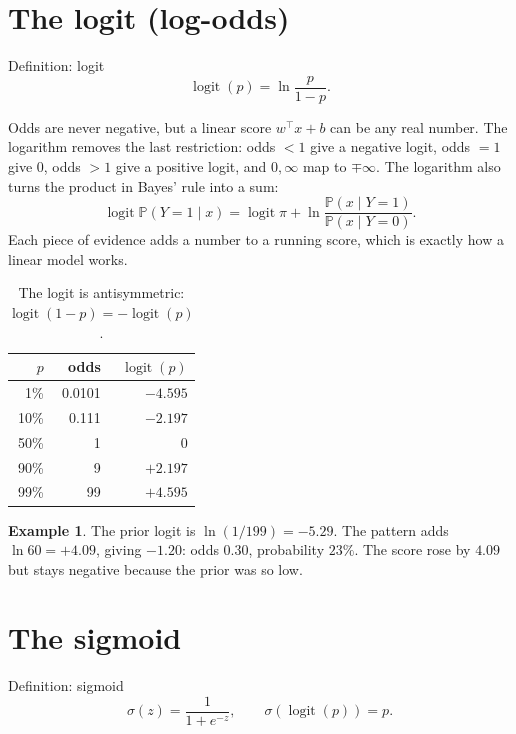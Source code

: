 \documentclass[11pt,a4paper]{article}
\newcommand{\Prob}{\mathbb{P}}
\DeclareMathOperator{\logit}{logit}
\theoremstyle{definition}
\newtheorem{example}{Example}
\begin{document}
\section{The logit (log-odds)}

\begin{metric}{Definition: logit}
\[
\logit(p)=\ln\frac{p}{1-p}.
\]
\end{metric}

Odds are never negative, but a linear score $w^\top x+b$ can be any real number. The logarithm removes the last restriction: odds $<1$ give a negative logit, odds $=1$ give $0$, odds $>1$ give a positive logit, and $0,\infty$ map to $\mp\infty$. The logarithm also turns the product in Bayes' rule into a sum:
\[
\logit\Prob(Y=1\mid x)=\logit\pi+\ln\frac{\Prob(x\mid Y=1)}{\Prob(x\mid Y=0)}.
\]
Each piece of evidence adds a number to a running score, which is exactly how a linear model works.

\begin{table}[h]
\centering
\begin{tabular}{rrr}
\toprule
$p$ & odds & $\logit(p)$\\
\midrule
1\% & 0.0101 & $-4.595$\\
10\% & 0.111 & $-2.197$\\
50\% & 1 & $0$\\
90\% & 9 & $+2.197$\\
99\% & 99 & $+4.595$\\
\bottomrule
\end{tabular}
\caption{The logit is antisymmetric: $\logit(1-p)=-\logit(p)$.}
\end{table}

\begin{example}
The prior logit is $\ln(1/199)=-5.29$. The pattern adds $\ln 60=+4.09$, giving $-1.20$: odds $0.30$, probability $23\%$. The score rose by $4.09$ but stays negative because the prior was so low.
\end{example}

\section{The sigmoid}

\begin{metric}{Definition: sigmoid}
\[
\sigma(z)=\frac{1}{1+e^{-z}},\qquad \sigma(\logit(p))=p.
\]
\end{metric}
\end{document}

